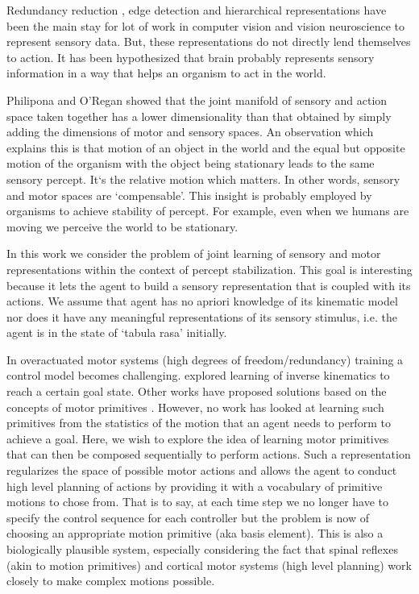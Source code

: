\documentclass[conference]{IEEEtran}
\begin{document}

\IEEEpeerreviewmaketitle

Redundancy reduction \cite{barlow1961possible}, edge detection \cite{hubel1968receptive}  and hierarchical representations \cite{krizhevsky2012imagenet} have been the main stay for lot of work in computer vision and vision neuroscience to represent sensory data. But, these representations do not directly lend themselves to action. It has been hypothesized \cite{o2001sensorimotor} that brain probably represents sensory information in a way that helps an organism to act in the world.  

Philipona and O'Regan \cite{philipona2003there,philipona2003perception} showed that the joint manifold of sensory and action space taken together has a lower dimensionality than that obtained by simply adding the dimensions of motor and sensory spaces. An observation which explains this is that motion of an object in the world and the equal but opposite motion of the organism with the object being stationary leads to the same sensory percept. It`s the relative motion which matters. In other words, sensory and motor spaces are `compensable'. This insight is probably employed by organisms to achieve stability of percept. For example, even when we humans are moving we perceive the world to be stationary. 


In this work we consider the problem of joint learning of sensory and motor representations within the context of percept stabilization.  This goal is interesting because it lets the agent to build a sensory representation that is coupled with its actions. We assume that agent has no apriori knowledge of its kinematic model nor does it have any meaningful representations of its sensory stimulus, i.e. the agent is in the state of `tabula rasa' initially.  


In overactuated motor systems (high degrees of freedom/redundancy) training a control model becomes challenging. \cite{rolf2012efficient} explored learning of inverse kinematics to reach a certain goal state. Other works have proposed solutions based on the concepts of motor primitives \cite{schaal2005learning}. However, no work has looked at learning such primitives from the statistics of the motion that an agent needs to perform to achieve a goal.  Here, we wish to explore the idea of learning motor primitives that can then be composed sequentially to perform actions. 
Such a representation regularizes the space of possible motor actions and allows the agent to conduct high level planning of actions by providing it with a vocabulary of primitive motions to chose from. That is to say, at each time step we no longer have to specify the control sequence for each controller but the problem is now of choosing an appropriate motion primitive (aka basis element). This is also a biologically plausible system, especially considering the fact that spinal reflexes (akin to motion primitives) and cortical motor systems (high level planning)  work closely to make complex motions possible\cite{kandel2000principles}. 
\end{document}

